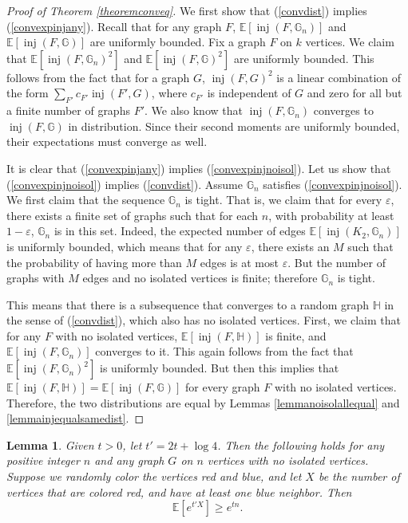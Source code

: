 \documentclass{amsart}
\numberwithin{equation}{section}
\numberwithin{figure}{section}
\newtheorem{lemma}[theorem]{Lemma}
\theoremstyle{definition}
\theoremstyle{remark}
\DeclareMathOperator{\inj}{inj}
\newcommand{\EE}{\mathbb{E}}
\begin{document}
\begin{proof}[Proof of Theorem \ref{theoremconveq}]
We first show that (\ref{convdist}) implies (\ref{convexpinjany}). Recall
that for any graph $F$, $\EE[\inj(F,\mathbb{G}_n)]$ and
$\EE[\inj(F,\mathbb{G})]$ are uniformly bounded. Fix a graph $F$ on $k$
vertices. We claim that $\EE[\inj(F,\mathbb{G}_n)^2]$ and
$\EE[\inj(F,\mathbb{G})^2]$ are uniformly bounded. This follows from the fact
that for a graph $G$, $\inj(F,G)^2$ is a linear combination of the form
$\sum_{F'} c_{F'} \inj(F',G)$, where $c_{F'}$ is independent of $G$ and zero
for all but a finite number of graphs $F'$. We also know that
$\inj(F,\mathbb{G}_n)$ converges to $\inj(F,\mathbb{G})$ in distribution.
Since their second moments are uniformly bounded, their expectations must
converge as well.

It is clear that (\ref{convexpinjany}) implies (\ref{convexpinjnoisol}). Let
us show that (\ref{convexpinjnoisol}) implies (\ref{convdist}). Assume
$\mathbb{G}_n$ satisfies (\ref{convexpinjnoisol}). We first claim that the
sequence $\mathbb{G}_n$ is tight. That is, we claim that for every
$\varepsilon$, there exists a finite set of graphs such that for each $n$,
with probability at least $1-\varepsilon$, $\mathbb{G}_n$ is in this set.
Indeed, the expected number of edges $\EE[\inj(K_2,\mathbb{G}_n)]$ is
uniformly bounded, which means that for any $\varepsilon$, there exists an
$M$ such that the probability of having more than $M$ edges is at most
$\varepsilon$. But the number of graphs with $M$ edges and no isolated
vertices is finite; therefore $\mathbb{G}_n$ is tight.

This means that there is a subsequence that converges to a random graph
$\mathbb{H}$ in the sense of (\ref{convdist}), which also has no isolated
vertices. First, we claim that for any $F$ with no isolated vertices,
$\EE[\inj(F,\mathbb{H})]$ is finite, and $\EE[\inj(F,\mathbb{G}_n)]$
converges to it. This again follows from the fact that
$\EE[\inj(F,\mathbb{G}_n)^2]$ is uniformly bounded. But then this implies
that $\EE[\inj(F,\mathbb{H})]=\EE[\inj(F,\mathbb{G})]$ for every graph $F$
with no isolated vertices. Therefore, the two distributions are equal by
Lemmas \ref{lemmanoisolallequal} and \ref{lemmainjequalsamedist}.
\end{proof}

\begin{lemma}
Given $t>0$, let $t'=2t+\log 4$. Then the following holds for any positive
integer $n$ and any graph $G$ on $n$ vertices with no isolated vertices.
Suppose we randomly color the vertices red and blue, and let $X$ be the
number of vertices that are colored red, and have at least one blue neighbor.
Then
\[\EE[e^{t' X}] \ge e^{tn}.
\]
\end{lemma}
\end{document}
